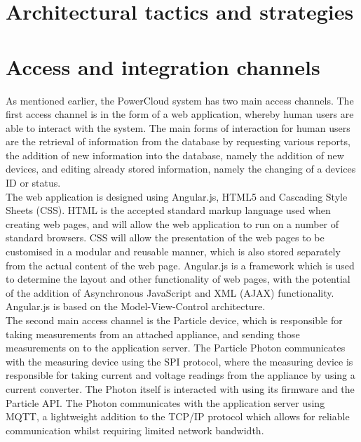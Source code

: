 \documentclass{article}
\begin{document}
\newpage

\section{Architectural tactics and strategies}

\newpage





\section{Access and integration channels}
	
	As mentioned earlier, the PowerCloud system has two main access 
	channels. The first access channel is in the form of a web 
	application, whereby human users are able to interact with the 
	system. The main forms of interaction for human users are the 
	retrieval of information from the database by requesting various 
	reports, the addition of new information into the database, namely 
	the addition of new devices, and editing already stored information, 
	namely the changing of a devices ID or status.\\
	
	The web application is designed using Angular.js, HTML5 and Cascading 
	Style Sheets (CSS). HTML is the accepted standard markup language 
	used when creating web pages, and will allow the web application to 
	run on a number of standard browsers. CSS will allow the presentation 
	of the web pages to be customised in a modular and reusable manner, 
	which is also stored separately from the actual content of the web 
	page. Angular.js is a framework which is used to determine the layout 
	and other functionality of web pages, with the potential of the 
	addition of Asynchronous JavaScript and XML (AJAX) functionality. 
	Angular.js is based on the Model-View-Control architecture.\\
	
	The second main access channel is the Particle device, which is 
	responsible for taking measurements from an attached appliance, and 
	sending those measurements on to the application server. The Particle 
	Photon communicates with the measuring device using the SPI protocol, 
	where the measuring device is responsible for taking current and 
	voltage readings from the appliance by using a current converter. The 
	Photon itself is interacted with using its firmware and the Particle 
	API. The Photon communicates with the application server using MQTT, 
	a lightweight addition to the TCP/IP protocol which allows for 
	reliable communication whilst requiring limited network bandwidth.\\
	
\end{document}
